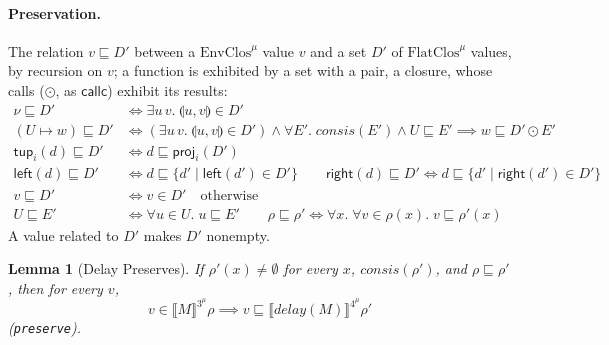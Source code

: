 \documentclass[10pt]{article}
\theoremstyle{acmplain}
\newtheorem{lemma}[theorem]{Lemma}
\newcommand{\SEM}[1]{\llbracket #1 \rrbracket}
\newcommand{\key}[1]{\mathsf{#1}}
\newcommand{\pass}[1]{\mathit{#1}}
\newcommand{\pairv}[2]{\llparenthesis #1, #2 \rrparenthesis}
\newcommand{\tup}[2]{\key{tup}_{#1}(#2)}
\newcommand{\Left}[1]{\key{left}(#1)}
\newcommand{\Right}[1]{\key{right}(#1)}
\newcommand{\NE}{\neq\emptyset}
\newcommand{\consis}{\mathit{consis}}
\newcommand{\Ml}[1]{\textrm{#1}^{\mu}}                  %
\begin{document}
\paragraph{Preservation.}
The relation $v \sqsubseteq D'$ between a $\Ml{EnvClos}$ value $v$ and a set
$D'$ of $\Ml{FlatClos}$ values, by recursion on $v$; a function is exhibited
by a set with a pair, a closure, whose calls ($\odot$, as $\key{callc}$)
exhibit its results:
\begin{align*}
  \nu \sqsubseteq D' &\iff \exists u\, v.\; \pairv{u}{v} \in D' \\
  (U \mapsto w) \sqsubseteq D' &\iff (\exists u\, v.\; \pairv{u}{v} \in D') \land
     \forall E'.\; \consis(E') \land U \sqsubseteq E' \implies w \sqsubseteq D' \odot E' \\
  \tup{i}{d} \sqsubseteq D' &\iff d \sqsubseteq \key{proj}_i(D') \\
  \Left{d} \sqsubseteq D' &\iff d \sqsubseteq \{ d' \mid \Left{d'} \in D' \} \qquad
  \Right{d} \sqsubseteq D' \iff d \sqsubseteq \{ d' \mid \Right{d'} \in D' \} \\
  v \sqsubseteq D' &\iff v \in D' \quad \text{otherwise} \\[1ex]
  U \sqsubseteq E' &\iff \forall u \in U.\; u \sqsubseteq E' \qquad
  \rho \sqsubseteq \rho' \iff \forall x.\; \forall v \in \rho(x).\; v \sqsubseteq \rho'(x)
\end{align*}
A value related to $D'$ makes $D'$ nonempty.
\begin{lemma}[Delay Preserves]\label{lem:m-den-delay-preserve}
If $\rho'(x) \NE$ for every $x$, $\consis(\rho')$, and $\rho \sqsubseteq \rho'$, then for every $v$,
\[ v \in \SEM{M}^{\Ml{3}}\rho \implies v \sqsubseteq \SEM{\pass{delay}(M)}^{\Ml{4}}\rho' \]
(\texttt{preserve}).
\end{lemma}
\end{document}
